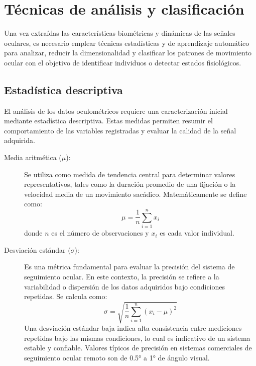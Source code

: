 \section{Técnicas de análisis y clasificación}

Una vez extraídas las características biométricas y dinámicas de las señales oculares, es necesario emplear técnicas estadísticas y de aprendizaje automático para analizar, reducir la dimensionalidad y clasificar los patrones de movimiento ocular con el objetivo de identificar individuos o detectar estados fisiológicos.

\subsection{Estadística descriptiva}

El análisis de los datos oculométricos requiere una caracterización inicial mediante estadística descriptiva. Estas medidas permiten resumir el comportamiento de las variables registradas y evaluar la calidad de la señal adquirida.

\begin{description}
	\item[Media aritmética ($\mu$):] Se utiliza como medida de tendencia central para determinar valores representativos, tales como la duración promedio de una fijación o la velocidad media de un movimiento sacádico. Matemáticamente se define como:
	\begin{equation}
		\mu = \frac{1}{n} \sum_{i=1}^{n} x_i
	\end{equation}
	donde $n$ es el número de observaciones y $x_i$ es cada valor individual.
	
	\item[Desviación estándar ($\sigma$):] Es una métrica fundamental para evaluar la precisión del sistema de seguimiento ocular. En este contexto, la precisión se refiere a la variabilidad o dispersión de los datos adquiridos bajo condiciones repetidas. Se calcula como:
	\begin{equation}
		\sigma = \sqrt{\frac{1}{n} \sum_{i=1}^{n} (x_i - \mu)^2}
	\end{equation}
	Una desviación estándar baja indica alta consistencia entre mediciones repetidas bajo las mismas condiciones, lo cual es indicativo de un sistema estable y confiable. Valores típicos de precisión en sistemas comerciales de seguimiento ocular remoto son de 0.5° a 1° de ángulo visual.
\end{description}





